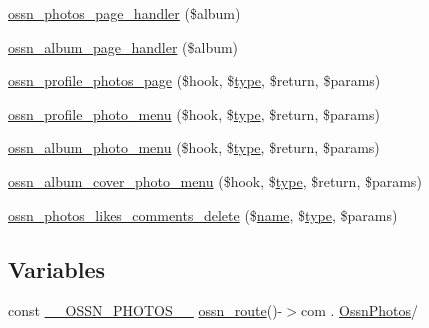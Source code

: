 \begin{DoxyCompactItemize}
\item 
\hyperlink{_ossn_photos_2ossn__com_8php_a2ecd0a1b37329a821c826c3e5a99cffd}{ossn\+\_\+photos\+\_\+page\+\_\+handler} (\$album)
\item 
\hyperlink{_ossn_photos_2ossn__com_8php_ab066873ca8ecd10b76ed0f595cb647f5}{ossn\+\_\+album\+\_\+page\+\_\+handler} (\$album)
\item 
\hyperlink{_ossn_photos_2ossn__com_8php_a45494f3045da897390dfc27ac73fdcd8}{ossn\+\_\+profile\+\_\+photos\+\_\+page} (\$hook, \$\hyperlink{_ossn_wall_2actions_2wall_2post_2group_8php_a2dc1bb4e1ed0029daa81ac0776b14b51}{type}, \$return, \$params)
\item 
\hyperlink{_ossn_photos_2ossn__com_8php_af01de4cabb171bc07c043f2fc905ba6a}{ossn\+\_\+profile\+\_\+photo\+\_\+menu} (\$hook, \$\hyperlink{_ossn_wall_2actions_2wall_2post_2group_8php_a2dc1bb4e1ed0029daa81ac0776b14b51}{type}, \$return, \$params)
\item 
\hyperlink{_ossn_photos_2ossn__com_8php_a626f329c4446b2daa40f1981aad58b20}{ossn\+\_\+album\+\_\+photo\+\_\+menu} (\$hook, \$\hyperlink{_ossn_wall_2actions_2wall_2post_2group_8php_a2dc1bb4e1ed0029daa81ac0776b14b51}{type}, \$return, \$params)
\item 
\hyperlink{_ossn_photos_2ossn__com_8php_a45976401a8e94b9b3b5f3673f6d1ed90}{ossn\+\_\+album\+\_\+cover\+\_\+photo\+\_\+menu} (\$hook, \$\hyperlink{_ossn_wall_2actions_2wall_2post_2group_8php_a2dc1bb4e1ed0029daa81ac0776b14b51}{type}, \$return, \$params)
\item 
\hyperlink{_ossn_photos_2ossn__com_8php_a16aaf7091f3d8029fe160b10418041eb}{ossn\+\_\+photos\+\_\+likes\+\_\+comments\+\_\+delete} (\$\hyperlink{user_8php_a765af5e9671743530143a6d3670fd9a6}{name}, \$\hyperlink{_ossn_wall_2actions_2wall_2post_2group_8php_a2dc1bb4e1ed0029daa81ac0776b14b51}{type}, \$params)
\end{DoxyCompactItemize}
\subsection*{Variables}
\begin{DoxyCompactItemize}
\item 
const \hyperlink{_ossn_photos_2ossn__com_8php_a622b2f4cdd3cb2eaa43f36170f914ebd}{\+\_\+\+\_\+\+O\+S\+S\+N\+\_\+\+P\+H\+O\+T\+O\+S\+\_\+\+\_\+} \hyperlink{ossn_8lib_8route_8php_ac23dc424aa33dcd57982b72f4ed1217e}{ossn\+\_\+route}()-\/$>$com . \textquotesingle{}\hyperlink{class_ossn_photos}{Ossn\+Photos}/\textquotesingle{}
\end{DoxyCompactItemize}


